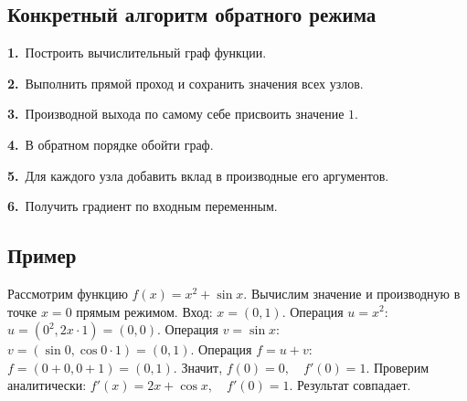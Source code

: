 \documentclass[12pt,a4paper]{article}
\begin{document}
\subsection{Конкретный алгоритм обратного режима}
\noindent\textbf{1.}\ Построить вычислительный граф функции.\par
\noindent\textbf{2.}\ Выполнить прямой проход и сохранить значения всех узлов.\par
\noindent\textbf{3.}\ Производной выхода по самому себе присвоить значение $1$.\par
\noindent\textbf{4.}\ В обратном порядке обойти граф.\par
\noindent\textbf{5.}\ Для каждого узла добавить вклад в производные его аргументов.\par
\noindent\textbf{6.}\ Получить градиент по входным переменным.\par
\subsection{Пример}
Рассмотрим функцию $f(x) = x^2 + \sin x.$
Вычислим значение и производную в точке $x=0$ прямым режимом.
Вход: $x = (0,1).$
Операция $u=x^2$: $u = (0^2, 2x \cdot 1) = (0,0).$
Операция $v=\sin x$: $v = (\sin 0, \cos 0 \cdot 1) = (0,1).$
Операция $f=u+v$: $f = (0+0, 0+1) = (0,1).$
Значит, $f(0)=0,\quad f'(0)=1.$
Проверим аналитически: $f'(x)=2x+\cos x,\quad f'(0)=1.$
Результат совпадает.
\end{document}
